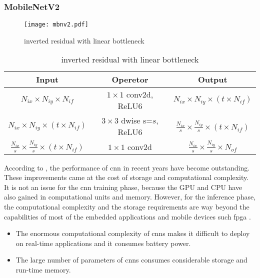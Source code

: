 \subsubsection{MobileNetV2} \label{subs:mbv2}
%
\begin{figure}
    \centering
    \texttt{[image: mbnv2.pdf]}
    \caption{inverted residual with linear bottleneck \cite{sandler_mobilenetv2_2019}}
    \label{fig:invreslinbot}
\end{figure}
\begin{table}
    \center
    \begin{tabular}{c|c|c}
        Input & Operetor & Output \\
        \hline \hline
        $N_{ix} \times N_{iy} \times N_{if}$ & $1 \times 1$ conv2d, ReLU6 & $N_{ix} \times N_{iy} \times (t \times N_{if})$ \\
        $N_{ix} \times N_{iy} \times (t \times N_{if})$ & $3 \times3$ dwise s=$s$, ReLU6 & $\frac{N_{ix}}{s} \times \frac{N_{iy}}{s} \times (t \times N_{if})$ \\
        $\frac{N_{ix}}{s} \times \frac{N_{iy}}{s} \times (t \times N_{if})$ & $1 \times 1$ conv2d & $\frac{N_{ix}}{s} \times \frac{N_{iy}}{s} \times N_{of}$ \\
        \hline \hline
    \end{tabular}
    \caption{inverted residual with linear bottleneck \cite{sandler_mobilenetv2_2019}}
    \label{tab:invreslinbot}
\end{table}
%
According to \textcite{cheng_recent_2018}, the performance of \acrshort{cnn} in recent years have become outstanding. These improvements came at the cost of storage and computational complexity. It is not an issue for the \acrshort{cnn} training phase, because the GPU and CPU have also gained in computational units and memory. However, for the inference phase, the computational complexity and the storage requirements are way beyond the capabilities of most of the embedded applications and mobile devices such \acrshort{fpga} \cite{cheng_recent_2018}.
%
\begin{itemize}
    \item The enormous computational complexity of \acrshort{cnn}s makes it difficult to deploy on real-time applications and it consumes battery power.
    \item The large number of parameters of \acrshort{cnn}s consumes considerable storage and run-time memory.
\end{itemize}

